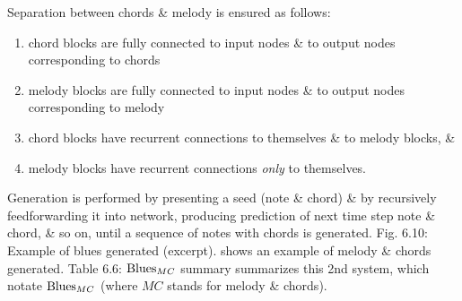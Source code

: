 \documentclass{article}
\begin{document}
\begin{itemize}
\begin{itemize}
\begin{itemize}
\begin{itemize}
				Separation between chords \& melody is ensured as follows:
				\begin{enumerate}
					\item chord blocks are fully connected to input nodes \& to output nodes corresponding to chords
					\item melody blocks are fully connected to input nodes \& to output nodes corresponding to melody
					\item chord blocks have recurrent connections to themselves \& to melody blocks, \&
					\item melody blocks have recurrent connections {\it only} to themselves.
				\end{enumerate}
				Generation is performed by presenting a seed (note \& chord) \& by recursively feedforwarding it into network, producing prediction of next time step note \& chord, \& so on, until a sequence of notes with chords is generated. {\sf Fig. 6.10: Example of blues generated (excerpt).} shows an example of melody \& chords generated. {\sf Table 6.6: ${\rm Blues}_{MC}$ summary} summarizes this 2nd system, which notate ${\rm Blues}_{MC}$ (where $MC$ stands for melody \& chords).


\end{itemize}
\end{itemize}
\end{itemize}
\end{itemize}
\end{document}
